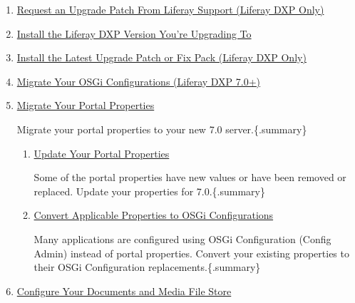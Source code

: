 \begin{enumerate}
  \begin{enumerate}
  \def\labelenumii{\arabic{enumii}.}
  \item
    \href{/docs/7-2/deploy/-/knowledge_base/d/preparing-to-upgrade-the-product-database\#synchronize-a-complete-backup}{Request
    an Upgrade Patch From Liferay Support (Liferay DXP Only)}
  \item
    \href{/docs/7-2/deploy/-/knowledge_base/d/preparing-a-new-product-server-for-data-upgrade\#install-liferay}{Install
    the Liferay DXP Version You're Upgrading To}
  \item
    \href{/docs/7-2/deploy/-/knowledge_base/d/preparing-a-new-product-server-for-data-upgrade\#install-the-latest-upgrade-patch-or-fix-pack-liferay-dxp-only}{Install
    the Latest Upgrade Patch or Fix Pack (Liferay DXP Only)}
  \item
    \href{/docs/7-2/deploy/-/knowledge_base/d/preparing-a-new-product-server-for-data-upgrade\#migrate-your-osgi-configurations-70}{Migrate
    Your OSGi Configurations (Liferay DXP 7.0+)}
  \item
    \href{/docs/7-2/deploy/-/knowledge_base/d/preparing-a-new-product-server-for-data-upgrade\#migrate-your-portal-properties}{Migrate
    Your Portal Properties}

    Migrate your portal properties to your new 7.0 server.\{.summary\}

    \begin{enumerate}
    \def\labelenumiii{\arabic{enumiii}.}
    \item
      \href{/docs/7-2/deploy/-/knowledge_base/d/preparing-a-new-product-server-for-data-upgrade\#update-your-portal-properties}{Update
      Your Portal Properties}

      Some of the portal properties have new values or have been removed
      or replaced. Update your properties for 7.0.\{.summary\}
    \item
      \href{/docs/7-2/deploy/-/knowledge_base/d/preparing-a-new-product-server-for-data-upgrade\#convert-applicable-properties-to-osgi-configurations}{Convert
      Applicable Properties to OSGi Configurations}

      Many applications are configured using OSGi Configuration (Config
      Admin) instead of portal properties. Convert your existing
      properties to their OSGi Configuration replacements.\{.summary\}
    \end{enumerate}
  \item
    \href{/docs/7-2/deploy/-/knowledge_base/d/preparing-a-new-product-server-for-data-upgrade\#configure-your-documents-and-media-file-store}{Configure
    Your Documents and Media File Store}


\end{enumerate}
\end{enumerate}
